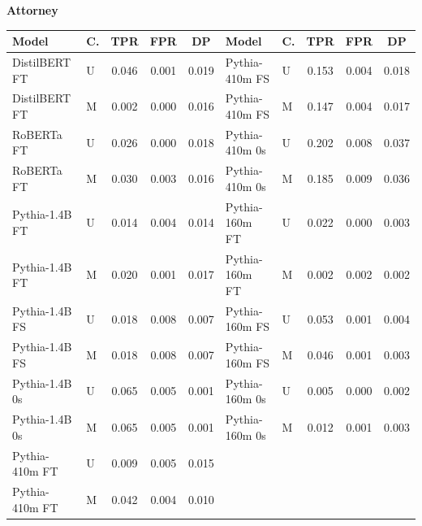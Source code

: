 \documentclass[11pt]{article}
\begin{document}
\vspace{4pt}\noindent\textbf{Attorney}
\begin{center}\scriptsize
\begin{tabular}{llccc|llccc}
\toprule
\textbf{Model} & \textbf{C.} & \textbf{TPR} & \textbf{FPR} & \textbf{DP} & \textbf{Model} & \textbf{C.} & \textbf{TPR} & \textbf{FPR} & \textbf{DP} \\
\midrule
DistilBERT FT & U & 0.046 & 0.001 & 0.019 & Pythia-410m FS & U & 0.153 & 0.004 & 0.018 \\
DistilBERT FT & M & 0.002 & 0.000 & 0.016 & Pythia-410m FS & M & 0.147 & 0.004 & 0.017 \\
RoBERTa FT & U & 0.026 & 0.000 & 0.018 & Pythia-410m 0s & U & 0.202 & 0.008 & 0.037 \\
RoBERTa FT & M & 0.030 & 0.003 & 0.016 & Pythia-410m 0s & M & 0.185 & 0.009 & 0.036 \\
Pythia-1.4B FT & U & 0.014 & 0.004 & 0.014 & Pythia-160m FT & U & 0.022 & 0.000 & 0.003 \\
Pythia-1.4B FT & M & 0.020 & 0.001 & 0.017 & Pythia-160m FT & M & 0.002 & 0.002 & 0.002 \\
Pythia-1.4B FS & U & 0.018 & 0.008 & 0.007 & Pythia-160m FS & U & 0.053 & 0.001 & 0.004 \\
Pythia-1.4B FS & M & 0.018 & 0.008 & 0.007 & Pythia-160m FS & M & 0.046 & 0.001 & 0.003 \\
Pythia-1.4B 0s & U & 0.065 & 0.005 & 0.001 & Pythia-160m 0s & U & 0.005 & 0.000 & 0.002 \\
Pythia-1.4B 0s & M & 0.065 & 0.005 & 0.001 & Pythia-160m 0s & M & 0.012 & 0.001 & 0.003 \\
Pythia-410m FT & U & 0.009 & 0.005 & 0.015 & & & & & \\
Pythia-410m FT & M & 0.042 & 0.004 & 0.010 & & & & & \\
\bottomrule
\end{tabular}
\end{center}
\end{document}
